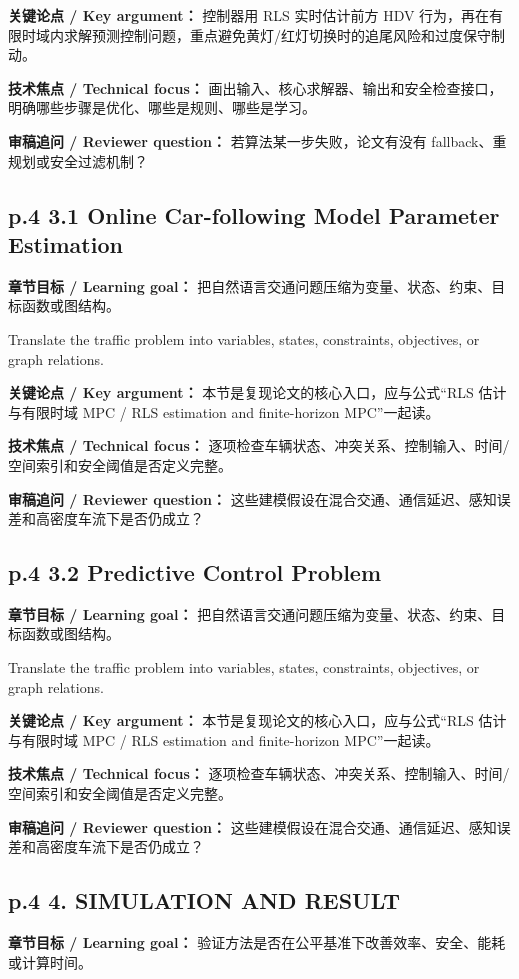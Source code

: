 \documentclass[UTF8,a4paper,11pt,fontset=fandol]{ctexart}
\begin{document}
\textbf{关键论点 / Key argument：} 控制器用 RLS 实时估计前方 HDV 行为，再在有限时域内求解预测控制问题，重点避免黄灯/红灯切换时的追尾风险和过度保守制动。

\textbf{技术焦点 / Technical focus：} 画出输入、核心求解器、输出和安全检查接口，明确哪些步骤是优化、哪些是规则、哪些是学习。

\textbf{审稿追问 / Reviewer question：} 若算法某一步失败，论文有没有 fallback、重规划或安全过滤机制？

\subsection*{p.4 3.1 Online Car-following Model Parameter Estimation}
\textbf{章节目标 / Learning goal：} 把自然语言交通问题压缩为变量、状态、约束、目标函数或图结构。

Translate the traffic problem into variables, states, constraints, objectives, or graph relations.

\textbf{关键论点 / Key argument：} 本节是复现论文的核心入口，应与公式“RLS 估计与有限时域 MPC / RLS estimation and finite-horizon MPC”一起读。

\textbf{技术焦点 / Technical focus：} 逐项检查车辆状态、冲突关系、控制输入、时间/空间索引和安全阈值是否定义完整。

\textbf{审稿追问 / Reviewer question：} 这些建模假设在混合交通、通信延迟、感知误差和高密度车流下是否仍成立？

\subsection*{p.4 3.2 Predictive Control Problem}
\textbf{章节目标 / Learning goal：} 把自然语言交通问题压缩为变量、状态、约束、目标函数或图结构。

Translate the traffic problem into variables, states, constraints, objectives, or graph relations.

\textbf{关键论点 / Key argument：} 本节是复现论文的核心入口，应与公式“RLS 估计与有限时域 MPC / RLS estimation and finite-horizon MPC”一起读。

\textbf{技术焦点 / Technical focus：} 逐项检查车辆状态、冲突关系、控制输入、时间/空间索引和安全阈值是否定义完整。

\textbf{审稿追问 / Reviewer question：} 这些建模假设在混合交通、通信延迟、感知误差和高密度车流下是否仍成立？

\subsection*{p.4 4. SIMULATION AND RESULT}
\textbf{章节目标 / Learning goal：} 验证方法是否在公平基准下改善效率、安全、能耗或计算时间。
\end{document}
